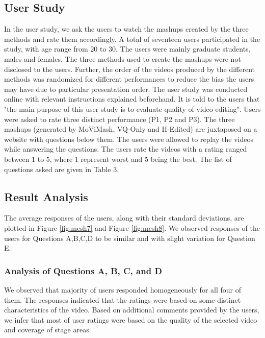 \documentclass{sig-alternate}
\begin{document}
\subsection{User Study}
In the user study, we ask the users to watch the mashups created
by the three methods and rate them accordingly. A total of seventeen users participated in the study, with age range from 20 to 30.
The users were mainly graduate students, males and females. The
three methods used to create the mashups were not disclosed to the
users. Further, the order of the videos produced by the different
methods was randomized for different performances to reduce the
bias the users may have due to particular presentation order.
The user study was conducted online with relevant instructions
explained beforehand. It is told to the users that "the main purpose
of this user study is to evaluate quality of video editing". Users
were asked to rate three distinct performance (P1, P2 and P3). The
three mashups (generated by MoViMash, VQ-Only and H-Edited)
are juxtaposed on a website with questions below them. The users were allowed to replay the videos while answering the questions.
The users rate the videos with a rating ranged between 1 to 5, where
1 represent worst and 5 being the best. The list of questions asked
are given in Table 3.


\subsection{Result Analysis}

The average responses of the users, along with their standard
deviations, are plotted in Figure \ref{fig:mesh7} and Figure \ref{fig:mesh8}. We observed responses of the users for Questions A,B,C,D to be similar and with
slight variation for Question E.
\subsubsection{Analysis of Questions A, B, C, and D}
We observed that majority of users responded homogeneously
for all four of them. The responses indicated that the ratings were
based on some distinct characteristics of the video. Based on additional comments provided by the users, we infer that most of user ratings were based on the quality of the selected video and coverage
of stage areas.
\end{document}
